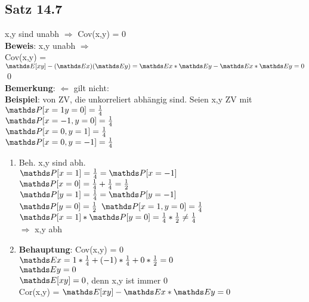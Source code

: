 \subsection{Satz 14.7}
x,y sind unabh $ \Rightarrow $ Cov(x,y) = 0\smallskip\\
\textbf{Beweis}: x,y unabh $\Rightarrow$\smallskip\\
Cov(x,y) = $\E[xy]-(\E x)(\E y) = \E x * \E y - \E x * \E y = 0$\qed\medskip\\
\textbf{Bemerkung}: $\Leftarrow $ gilt nicht:\\
\textbf{Beispiel}: von ZV, die unkorreliert abhängig sind. Seien x,y ZV mit $\PP[x=1y=0]=\frac{1}{4}$\smallskip\\
$\PP[x=-1, y=0]=\frac{1}{4}$\smallskip\\
$\PP[x=0, y=1]=\frac{1}{4}$\smallskip\\
$\PP[x=0, y=-1]=\frac{1}{4}$\smallskip\\
\begin{enumerate}
	\item Beh. x,y sind abh.\\
	$\PP[x=1]=\frac{1}{4}=\PP[x=-1]$\smallskip\\
	$\PP[x=0] = \frac{1}{4}+\frac{1}{4}=\frac{1}{2}$\smallskip\\
	$\PP[y=1] = \frac{1}{4} = \PP[y=-1]$\smallskip\\
	$\PP[y=0] = \frac{1}{2}$\smallskip
	$\PP[x=1,y=0] = \frac{1}{4}$\smallskip\\
	$\PP[x=1]*\PP[y=0] = \frac{1}{4}*\frac{1}{2} \neq \frac{1}{4}$\medskip\\
	$\Rightarrow$ x,y abh
	\item \textbf{Behauptung}: Cov(x,y) = 0\smallskip\\
	$\E x = 1 * \frac{1}{4}+(-1)*\frac{1}{4}+0*\frac{1}{2}=0$\smallskip\\
	$\E y = 0$\smallskip\\
	$\E[xy] = 0$, denn x,y ist immer 0 \medskip\\
	Cor(x,y) = $\E[xy]-\E x * \E y = 0$
	\end{enumerate}